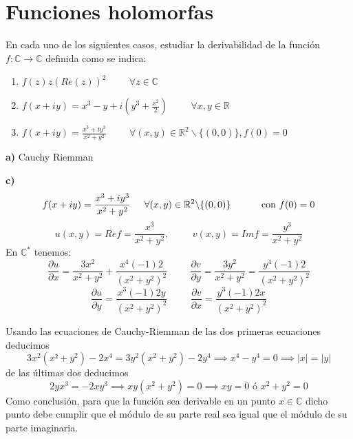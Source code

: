 \section{Funciones holomorfas}
\begin{ejer}
	En cada uno de los siguientes casos, estudiar la derivabilidad de la función $f:\mathbb{C} \rightarrow\mathbb{C}$ definida como se indica:
	\begin{enumerate}[label=(\alph*)]
		\item $f(z)  z(Re(z))^2 \hspace{1cm}\forall z\in\mathbb{C}$
		\item $f(x+iy) = x^3 -y+i\left( y^3 +\frac{x^2}{2} \right) \hspace{1cm} \forall x,y\in\mathbb{R}$
		\item $f(x+iy) = \frac{x^3+iy^3}{x^2+y^2} \hspace{1cm} \forall (x,y)\in\mathbb{R}^2\backslash\{(0,0)\}, f(0)=0$
	\end{enumerate}	
\end{ejer}
\begin{sol}
	
	\textbf{a)}
	Cauchy Riemman
	
	
	
	
	\textbf{c)}
	$$f(x+iy) = \frac{x^3+iy^3}{x^2+y^2}\hspace{0.5cm} \forall (x,y)\in\mathbb{R}^2 \backslash \{ (0,0) \}\hspace{1cm}\text{ con } f(0)=0$$
	$$u(x,y) = Re f = \frac{x^3}{x^2+y^2}, \hspace{1cm} v(x,y) = Imf = \frac{y^3}{x^2+y^2}$$
	En $\mathbb{C}^{\ast}$ tenemos:
	$$ \frac{\partial u}{\partial x} = \frac{3x^2}{x^2+y^2} + \frac{x^4(-1)2}{(x^2+y^2)^2} \hspace{1cm}
	\frac{\partial v}{\partial y} = \frac{3y^2}{x^2+y^2} = \frac{y^4(-1)2}{(x^2+y^2)^2}$$
	$$ \frac{\partial u}{\partial y} = \frac{x^3 (-1)2y}{(x^2+y^2)^2} \hspace{1cm}
	\frac{\partial v}{\partial x} = \frac{y^3(-1)2x}{(x^2+y^2)^2}$$
	
	Usando las ecuaciones de Cauchy-Riemman de las dos primeras ecuaciones deducimos
	$$3x^2(x²+y^2) - 2x^4 = 3y^2(x^2+y^2)-2y^4 \implies x^4-y^4 = 0 \implies |x|=|y|$$
	de las últimas dos deducimos
	$$2yx^3=-2xy^3 \implies xy(x^2+y^2) = 0 \implies xy=0 \text{ ó } x^2+y^2=0$$
	Como conclusión, para que la función sea derivable en un punto $x\in\mathbb{C}$ dicho punto debe cumplir que el módulo de su parte real sea igual que el módulo de su parte imaginaria.
	
\end{sol}



